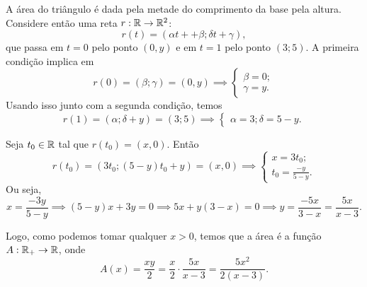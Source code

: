 A área do triângulo é dada pela metade do comprimento da base pela altura.
Considere então uma reta $r:\mathbb{R}\rightarrow\mathbb{R}^2$:
\[
	r(t)=(\alpha t++\beta;\delta t+\gamma),
\]
que passa em $t=0$ pelo ponto $(0,y)$ e em $t=1$ pelo ponto $(3;5)$.
A primeira condição implica em
\[
	r(0)=(\beta;\gamma)=(0,y)\implies\left\{\begin{array}{l} \beta=0;\\\gamma=y.\end{array}\right.
\]
Usando isso junto com a segunda condição, temos
\[
	r(1)=(\alpha;\delta+y)=(3;5)\implies\left\{\begin{array}{l}\alpha=3;\delta=5-y.\end{array}\right.
\]

Seja $t_0\in\mathbb{R}$ tal que $r(t_0)=(x,0)$.
Então
\[
	r(t_0)=(3t_0;(5-y)t_0+y)=(x,0)\implies\left\{\begin{array}{l}x=3t_0;\\t_0=\frac{-y}{5-y}.\end{array}\right.
\]
Ou seja,
\[
	x=\frac{-3y}{5-y}\implies (5-y)x+3y=0\implies 5x+y(3-x)=0\implies y=\frac{-5x}{3-x}=\frac{5x}{x-3}.
\]

Logo, como podemos tomar qualquer $x>0$, temos que a área é a função $A:\mathbb{R}_+\rightarrow\mathbb{R}$, onde
\[
	A(x)=\frac{xy}{2}=\frac{x}{2}\cdot\frac{5x}{x-3}=\frac{5x^2}{2(x-3)}.
\]
